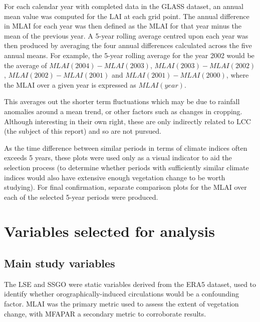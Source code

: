 For each calendar year with completed data in the \ac{GLASS} dataset, an annual mean value was computed for the \ac{LAI} at each grid point. The annual difference in \ac{MLAI} for each year was then defined as the \ac{MLAI} for that year minus the mean of the previous year. A 5-year rolling average centred upon each year was then produced by averaging the four annual differences calculated across the five annual means. For example, the 5-year rolling average for the year 2002 would be the average of $MLAI(2004)-MLAI(2003)$, $MLAI(2003)-MLAI(2002)$, $MLAI(2002)-MLAI(2001)$ and $MLAI(2001)-MLAI(2000)$, where the \ac{MLAI} over a given year is expressed as $MLAI(year)$.

This averages out the shorter term fluctuations which may be due to rainfall anomalies around a mean trend, or other factors such as changes in cropping. Although interesting in their own right, these are only indirectly related to \ac{LCC} (the subject of this report) and so are not pursued.

As the time difference between similar periods in terms of climate indices often exceeds 5 years, these plots were used only as a visual indicator to aid the selection process (to determine whether periods with sufficiently similar climate indices would also have extensive enough vegetation change to be worth studying). For final confirmation, separate comparison plots for the \ac{MLAI} over each of the selected 5-year periods were produced.

\section{Variables selected for analysis}
\label{sec:method_var}

\subsection{Main study variables}

The \acf{LSE} and \acf{SSGO} were static variables derived from the \ac{ERA5} dataset, used to identify whether orographically-induced circulations would be a confounding factor. \acf{MLAI} was the primary metric used to assess the extent of vegetation change, with \acf{MFAPAR} a secondary metric to corroborate results. 

